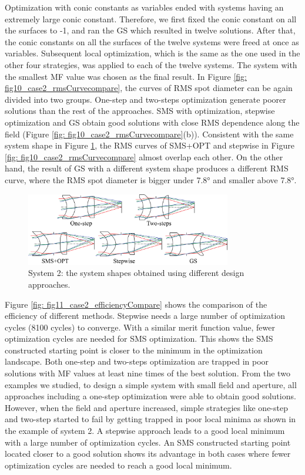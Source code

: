 Optimization with conic constants as variables ended with systems having an extremely large conic constant. Therefore, we first fixed the conic constant on all the surfaces to -1, and ran the GS which resulted in twelve solutions. After that, the conic constants on all the surfaces of the twelve systems were freed at once as variables. Subsequent local optimization, which is the same as the one used in the other four strategies, was applied to each of the twelve systems. The system with the smallest MF value was chosen as the final result. In Figure \ref{fig: fig10_case2_rmsCurvecompare}, the curves of RMS spot diameter can be again divided into two groups. One-step and two-steps optimization generate poorer solutions than the rest of the approaches. SMS with optimization, stepwise optimization and GS obtain good solutions with close RMS dependence along the field (Figure \ref{fig: fig10_case2_rmsCurvecompare}(b)). Consistent with the same system shape in Figure \ref{fig: fig9_case2_systems}, the RMS curves of SMS+OPT and stepwise in Figure \ref{fig: fig10_case2_rmsCurvecompare} almost overlap each other. On the other hand, the result of GS with a different system shape produces a different RMS curve, where the RMS spot diameter is bigger under 7.8° and smaller above 7.8°.

\begin{figure}[h!]
    \centering
    \includegraphics[width=0.8\textwidth]{chapter-5/figures/Figure9_system2_solutions.png}
    \caption{System 2: the system shapes obtained using different design approaches.}
    \label{fig: fig9_case2_systems}
\end{figure}

Figure \ref{fig: fig11_case2_efficiencyCompare} shows the comparison of the efficiency of different methods. Stepwise needs a large number of optimization cycles (8100 cycles) to converge. With a similar merit function value, fewer optimization cycles are needed for SMS optimization. This shows the SMS constructed starting point is closer to the minimum in the optimization landscape. Both one-step and two-steps optimization are trapped in poor solutions with MF values at least nine times of the best solution. 
From the two examples we studied, to design a simple system with small field and aperture, all approaches including a one-step optimization were able to obtain good solutions. However, when the field and aperture increased, simple strategies like one-step and two-step started to fail by getting trapped in poor local minima as shown in the example of system 2. A stepwise approach leads to a good local minimum with a large number of optimization cycles. An SMS constructed starting point located closer to a good solution shows its advantage in both cases where fewer optimization cycles are needed to reach a good local minimum.

